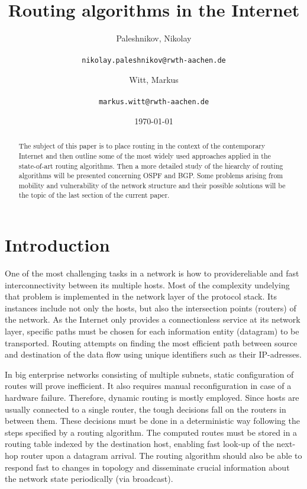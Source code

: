 \documentclass{acm_proc_article-sp}
\begin{document}
\title{Routing algorithms in the Internet}

\author{
  Paleshnikov, Nikolay\\
 \\
  \texttt{nikolay.paleshnikov@rwth-aachen.de}
  \and
  Witt, Markus\\
 \\
  \texttt{markus.witt@rwth-aachen.de}
}

\date{\today}

\maketitle
\begin{abstract}

The subject of this paper is to place routing in the context of the contemporary Internet and then outline some of the most widely used approaches applied in the state-of-art routing algorithms. Then a more detailed study of the hiearchy of routing algorithms will be presented concerning OSPF and BGP. Some problems arising from mobility and vulnerability of the network structure and their possible solutions will be the topic of the last section of the current paper.   

\end{abstract}


\section{Introduction}

One of the most challenging tasks in a network is how to providereliable and fast interconnectivity between its multiple hosts. Most of the complexity undelying that problem is implemented in the network layer of the protocol stack. Its instances include not only the hosts, but also the intersection points (routers) of the network. As the Internet only provides a connectionless service at its network layer, specific paths must be chosen for each information entity (datagram) to be transported. Routing attempts on finding the most efficient path between source and destination of the data flow using unique identifiers such as their IP-adresses.

In big enterprise networks consisting of multiple subnets, static configuration of routes will prove inefficient. It also requires manual reconfiguration in case of a hardware failure. Therefore, dynamic routing is mostly employed. Since hosts are usually connected to a single router, the tough decisions fall on the routers in between them. These decisions must be done in a deterministic way following the steps specified by a routing algorithm. The computed routes must be stored in a routing table indexed by the destination host, enabling fast look-up of the next-hop router upon a datagram arrival. The routing algorithm should also be able to respond fast to changes in topology and disseminate crucial information about the network state periodically (via broadcast).
\end{document}
